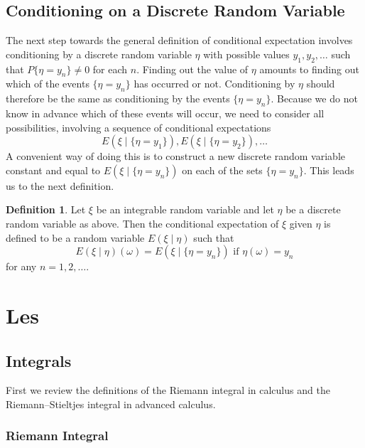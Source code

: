 \documentclass[
]{book}
\theoremstyle{definition}
\newtheorem{definition}{Definition}[chapter]
\theoremstyle{definition}
\theoremstyle{definition}
\theoremstyle{definition}
\theoremstyle{remark}
\begin{document}
\section{Conditioning on a Discrete Random Variable}\label{conditioning-on-a-discrete-random-variable}

The next step towards the general definition of conditional expectation involves conditioning by a discrete random variable \(\eta\) with possible values \(y_1, y_2, \ldots\) such that \(P\{\eta = y_n\} \neq 0\) for each \(n\). Finding out the value of \(\eta\) amounts to finding out which of the events \(\{\eta = y_n\}\) has occurred or not. Conditioning by \(\eta\) should therefore be the same as conditioning by the events \(\{\eta = y_n\}\). Because we do not know in advance which of these events will occur, we need to consider all possibilities, involving a sequence of conditional expectations
\[
E(\xi \mid \{\eta = y_1\}), E(\xi \mid \{\eta = y_2\}), \ldots
\]
A convenient way of doing this is to construct a new discrete random variable constant and equal to \(E(\xi \mid \{\eta = y_n\})\) on each of the sets \(\{\eta = y_n\}\). This leads us to the next definition.

\begin{definition}
\protect\hypertarget{def:unnamed-chunk-46}{}\label{def:unnamed-chunk-46}Let \(\xi\) be an integrable random variable and let \(\eta\) be a discrete random variable as above. Then the conditional expectation of \(\xi\) given \(\eta\) is defined to be a random variable \(E(\xi \mid \eta)\) such that
\[
E(\xi \mid \eta)(\omega) = E(\xi \mid \{\eta = y_n\}) \text{ if } \eta(\omega) = y_n
\]
for any \(n = 1, 2, \ldots\).
\end{definition}

\chapter{Les}\label{les}

\section{Integrals}\label{integrals}

First we review the definitions of the Riemann integral in calculus and the Riemann--Stieltjes integral in advanced calculus.

\subsection{Riemann Integral}\label{riemann-integral}
\end{document}
